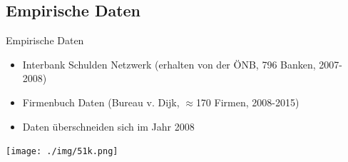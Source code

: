 \documentclass[]{beamer}
\begin{document}
\subsection{Empirische Daten}
\begin{frame}{Empirische Daten}
	\begin{itemize}[<+-|alert@+>]
		\item Interbank Schulden Netzwerk (erhalten von der ÖNB, 796 Banken, 2007-2008)
		\item Firmenbuch Daten (Bureau v. Dijk, $\approx$170 Firmen, 2008-2015)
		\item Daten überschneiden sich im Jahr 2008
	\end{itemize}

\end{frame}

\begin{frame}[plain]
	\begin{center}
		\texttt{[image: ./img/51k.png]}
	\end{center}
\end{frame}


\end{document}

